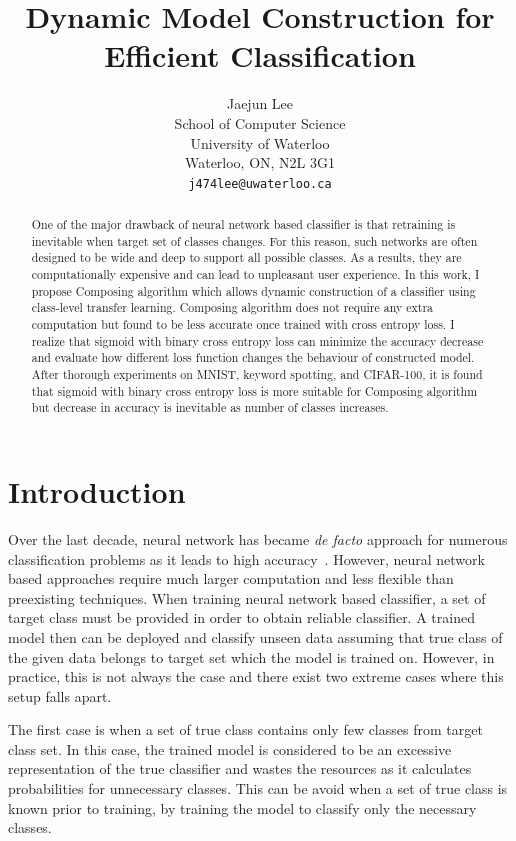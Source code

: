 \documentclass{article}
\title{Dynamic Model Construction for Efficient Classification}
\author{
    Jaejun Lee \\
    School of Computer Science\\
    University of Waterloo\\
    Waterloo, ON, N2L 3G1 \\
    \texttt{j474lee@uwaterloo.ca} \\
}
\begin{document}
\maketitle

\begin{abstract}

One of the major drawback of neural network based classifier is that retraining is inevitable when target set of classes changes. For this reason, such networks are often designed to be wide and deep to support all possible classes. As a results, they are computationally expensive and can lead to unpleasant user experience. In this work, I propose Composing algorithm which allows dynamic construction of a classifier using class-level transfer learning. Composing algorithm does not require any extra computation but found to be less accurate once trained with cross entropy loss. I realize that sigmoid with binary cross entropy loss can minimize the accuracy decrease and evaluate how different loss function changes the behaviour of constructed model. After thorough experiments on MNIST, keyword spotting, and CIFAR-100, it is found that sigmoid with binary cross entropy loss is more suitable for Composing algorithm but decrease in accuracy is inevitable as number of classes increases.

\end{abstract}

\section{Introduction}

Over the last decade, neural network has became {\it de facto} approach for numerous classification problems as it leads to high accuracy~\cite{lecun1998gradient, chen2014small, krizhevsky2009learning}. However, neural network based approaches require much larger computation and less flexible than preexisting techniques. When training neural network based classifier, a set of target class must be provided in order to obtain reliable classifier. A trained model then can be deployed and classify unseen data assuming that true class of the given data belongs to target set which the model is trained on. However, in practice, this is not always the case and there exist two extreme cases where this setup falls apart.

The first case is when a set of true class contains only few classes from target class set. In this case, the trained model is considered to be an excessive representation of the true classifier and wastes the resources as it calculates probabilities for unnecessary classes. This can be avoid when a set of true class is known prior to training, by training the model to classify only the necessary classes.
\end{document}
